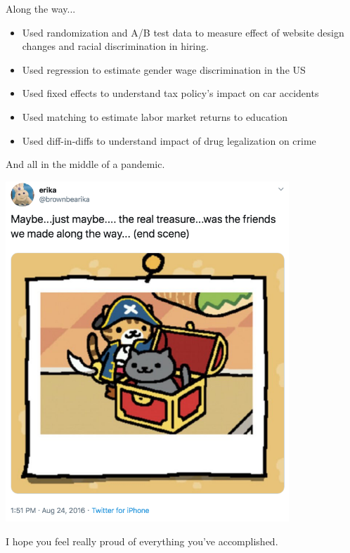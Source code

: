 \documentclass[11pt]{beamer}
\begin{document}
\begin{frame}[c]{Along the way...}
    \begin{itemize}
        \pause \item  Used randomization and A/B test data to measure effect of website design changes and racial discrimination in hiring.
        \pause \item  Used regression to estimate gender wage discrimination in the US
        \pause \item  Used fixed effects to understand tax policy's impact on car accidents
        \pause \item  Used matching to estimate labor market returns to education
        \pause \item  Used diff-in-diffs to understand impact of drug legalization on crime
    \end{itemize}
    \pause 
    \alert{And all in the middle of a pandemic.}
\end{frame}

\begin{frame}[c]
\pause 
\centering
      \includegraphics[width=0.8\textwidth]{maybe_the_real_treasure.png}
\end{frame}

\begin{frame}[c]
    \centering 
    \alert{I hope you feel really proud of everything you've accomplished.}
\end{frame}
    
\end{document}
